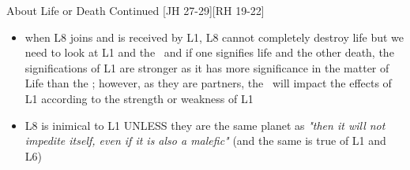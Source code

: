 \begin{frame}[t]{About Life or Death Continued [JH 27-29][RH 19-22]}
\begin{itemize}
\item when L8 joins and is received by L1, L8 cannot completely destroy life but we need to look at L1 and the \Moon\ and if one signifies life and the other death, the significations of L1 are stronger as it has more significance in the matter of Life than the \Moon; however, as they are partners, the \Moon\ will impact the effects of L1 according to the strength or weakness of L1

\item L8 is inimical to L1 UNLESS they are the same planet as \textsl{"then it will not impedite itself, even if it is also a malefic"} (and the same is true of L1 and L6)
\end{itemize}

\end{frame}